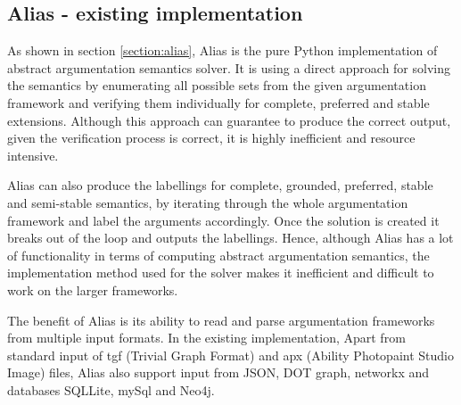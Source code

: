 \subsection{Alias - existing implementation}
As shown in section \ref{section:alias}, Alias \citep{alias} is the pure Python implementation of abstract argumentation semantics solver. It is using a direct approach for solving the semantics by enumerating all possible sets from the given argumentation framework and verifying them individually for complete, preferred and stable extensions. Although this approach can guarantee to produce the correct output, given the verification process is correct, it is highly inefficient and resource intensive. 

Alias can also produce the labellings for complete, grounded, preferred, stable and semi-stable semantics, by iterating through the whole argumentation framework and label the arguments accordingly. Once the solution is created it breaks out of the loop and outputs the labellings. Hence, although Alias has a lot of functionality in terms of computing abstract argumentation semantics, the implementation method used for the solver makes it inefficient and difficult to work on the larger frameworks. 

The benefit of Alias is its ability to read and parse argumentation frameworks from multiple input formats. In the existing implementation, Apart from standard input of tgf (Trivial Graph Format) and apx (Ability Photopaint Studio Image) files, Alias also support input from JSON, DOT graph, networkx and databases SQLLite, mySql and Neo4j. 


